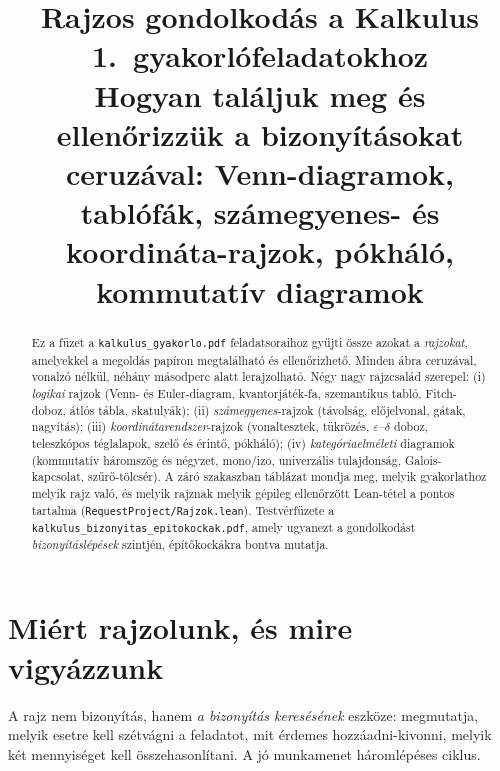 \documentclass[11pt,a4paper]{article}
\title{\textbf{Rajzos gondolkodás a Kalkulus 1.\ gyakorlófeladatokhoz}\\[2mm]
\large Hogyan találjuk meg és ellenőrizzük a bizonyításokat ceruzával:
Venn-diagramok, tablófák, számegyenes- és koordináta-rajzok, pókháló, kommutatív diagramok}
\author{}
\date{}
\newcommand{\lean}[1]{\texttt{\small #1}}
\newcommand{\eps}{\varepsilon}
\theoremstyle{definition}
\begin{document}
\sloppy
\maketitle

\begin{abstract}
Ez a füzet a \lean{kalkulus\_gyakorlo.pdf} feladatsoraihoz gyűjti össze azokat a
\emph{rajzokat}, amelyekkel a megoldás papíron megtalálható és ellenőrizhető.
Minden ábra ceruzával, vonalzó nélkül, néhány másodperc alatt lerajzolható.
Négy nagy rajzcsalád szerepel: (i) \emph{logikai} rajzok (Venn- és Euler-diagram,
kvantorjáték-fa, szemantikus tabló, Fitch-doboz, átlós tábla, skatulyák);
(ii) \emph{számegyenes}-rajzok (távolság, előjelvonal, gátak, nagyítás);
(iii) \emph{koordinátarendszer}-rajzok (vonaltesztek, tükrözés, $\eps$--$\delta$ doboz,
teleszkópos téglalapok, szelő és érintő, pókháló); (iv) \emph{kategóriaelméleti}
diagramok (kommutatív háromszög és négyzet, mono/izo, univerzális tulajdonság,
Galois-kapcsolat, szűrő-tölcsér).
A záró szakaszban táblázat mondja meg, melyik gyakorlathoz melyik rajz való,
és melyik rajznak melyik gépileg ellenőrzött Lean-tétel a pontos tartalma
(\lean{RequestProject/Rajzok.lean}).
Testvérfüzete a \lean{kalkulus\_bizonyitas\_epitokockak.pdf}, amely ugyanezt a
gondolkodást \emph{bizonyításlépések} szintjén, építőkockákra bontva mutatja.
\end{abstract}

\tableofcontents

\section{Miért rajzolunk, és mire vigyázzunk}

A rajz nem bizonyítás, hanem \emph{a bizonyítás keresésének} eszköze: megmutatja,
melyik esetre kell szétvágni a feladatot, mit érdemes hozzáadni-kivonni, melyik két
mennyiséget kell összehasonlítani. A jó munkamenet háromlépéses ciklus.

\begin{center}
\end{center}
\end{document}
